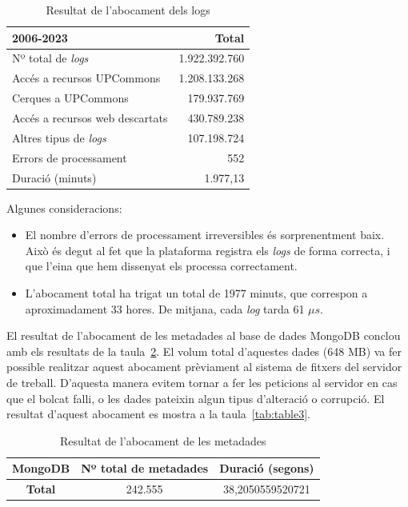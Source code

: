 \documentclass[lettersize,journal]{IEEEtran}
\begin{document}
\begin{table}[!t]
    \caption{Resultat de l'abocament dels logs}\label{tab:table1}
    \centering
    \begin{tabular}{|l|r|}
        \hline
        \textbf{2006-2023} & Total\\
        \hline
        Nº total de \textit{logs}       & 1.922.392.760\\
        \hline
        Accés a recursos UPCommons      & 1.208.133.268\\
        \hline
        Cerques a UPCommons             & 179.937.769\\
        \hline
        Accés a recursos web descartats & 430.789.238\\
        \hline
        Altres tipus de \textit{logs}   & 107.198.724\\
        \hline
        Errors de processament          & 552\\
        \hline
        Duració (minuts)                & 1.977,13\\
        \hline
    \end{tabular}
\end{table}

Algunes consideracions:

\begin{itemize}
    \item El nombre d'errors de processament irreversibles és sorprenentment baix.
    Això és degut al fet que la plataforma registra els \textit{logs} de forma correcta, i que l'eina que hem dissenyat els processa correctament.
    \item L'abocament total ha trigat un total de 1977 minuts, que correspon a aproximadament 33 hores.
    De mitjana, cada \textit{log} tarda 61 \(\mu s\).
\end{itemize}

El resultat de l'abocament de les metadades al base de dades MongoDB conclou amb els resultats de la taula~\ref{tab:table2}.
El volum total d'aquestes dades (648 MB) va fer possible realitzar aquest abocament prèviament al sistema de fitxers del servidor de treball.
D'aquesta manera evitem tornar a fer les peticions al servidor en cas que el bolcat falli, o les dades pateixin algun tipus d'alteració o corrupció.
El resultat d'aquest abocament es mostra a la taula~\ref{tab:table3}.

\begin{table}[!t]
    \caption{Resultat de l'abocament de les metadades\label{tab:table2}}
    \centering
    \begin{tabular}{|c|c|c|}
        \hline
        MongoDB & Nº total de metadades & Duració (segons)\\
        \hline
        \textbf{Total} & 242.555 & 38,2050559520721\\
        \hline
    \end{tabular}
\end{table}
\end{document}
